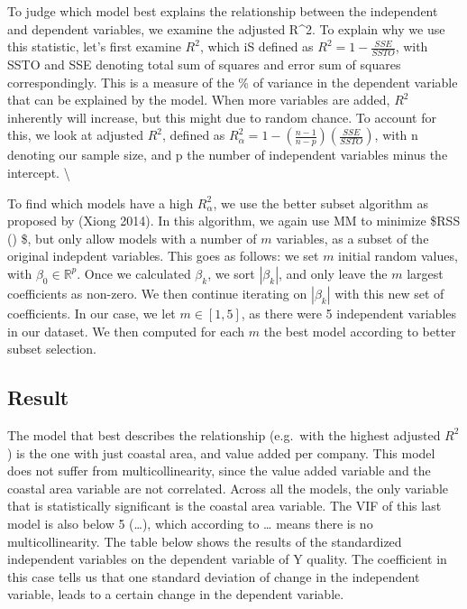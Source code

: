 \documentclass[
]{article}
\begin{document}
To judge which model best explains the relationship between the
independent and dependent variables, we examine the adjusted R\^{}2. To
explain why we use this statistic, let's first examine \(R^2\), which iS
defined as \(R^2 = 1 - \frac{SSE}{SSTO}\), with SSTO and SSE denoting
total sum of squares and error sum of squares correspondingly. This is a
measure of the \% of variance in the dependent variable that can be
explained by the model. When more variables are added, \(R^2\)
inherently will increase, but this might due to random chance. To
account for this, we look at adjusted \(R^2\), defined as
\(R^2_\alpha = 1 - (\frac{n-1}{n-p})(\frac{SSE}{SSTO})\), with n
denoting our sample size, and p the number of independent variables
minus the intercept. \textbackslash{}

To find which models have a high \(R^2_\alpha\), we use the better
subset algorithm as proposed by (Xiong 2014). In this algorithm, we
again use MM to minimize \$RSS (\boldsymbol{\beta}) \$, but only allow
models with a number of \(m\) variables, as a subset of the original
indepdent variables. This goes as follows: we set \(m\) initial random
values, with \(\beta_0\in\mathbb{R}^p\). Once we calculated \(\beta_k\),
we sort \(|\beta_k|\), and only leave the \(m\) largest coefficients as
non-zero. We then continue iterating on \(|\beta_k|\) with this new set
of coefficients. In our case, we let \(m \in [1,5]\), as there were 5
independent variables in our dataset. We then computed for each \(m\)
the best model according to better subset selection.

\hypertarget{Result}{%
\subsection{Result}\label{Result}}

The model that best describes the relationship (e.g.~with the highest
adjusted \(R^2\)) is the one with just coastal area, and value added per
company. This model does not suffer from multicollinearity, since the
value added variable and the coastal area variable are not correlated.
Across all the models, the only variable that is statistically
significant is the coastal area variable. The VIF of this last model is
also below 5 (\ldots), which according to \ldots{} means there is no
multicollinearity. The table below shows the results of the standardized
independent variables on the dependent variable of Y quality. The
coefficient in this case tells us that one standard deviation of change
in the independent variable, leads to a certain change in the dependent
variable.
\end{document}
